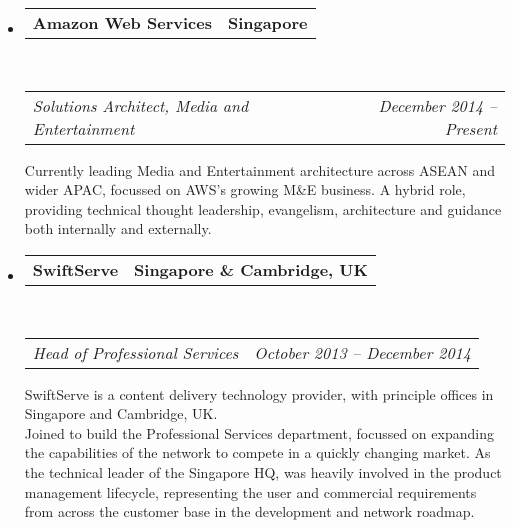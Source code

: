 \documentclass[10pt,a4paper]{article}
\makeatletter
\newcommand{\headerrow}[2]
{\begin{tabular*}{\linewidth}{l@{\extracolsep{\fill}}r}
    #1 &
    #2 \\
\end{tabular*}}
\makeatother
\begin{document}
\begin{itemize}
    \parskip=0.1em

    \item
        \headerrow
            {\textbf{Amazon Web Services}}
            {\textbf{Singapore}}
        \\
        \headerrow
            {\emph{Solutions Architect, Media and Entertainment}}
            {\emph{December 2014 -- Present}}
            
            Currently leading Media and Entertainment architecture across ASEAN and wider APAC, focussed on AWS's growing M\&E business. A hybrid role, providing technical thought leadership, evangelism, architecture and guidance both internally and externally.  
            


    \item
        \headerrow
            {\textbf{SwiftServe}}
            {\textbf{Singapore \& Cambridge, UK}}
        \\
        \headerrow
            {\emph{Head of Professional Services}}
            {\emph{October 2013 -- December 2014}}
    
            SwiftServe is a content delivery technology provider, with principle offices in Singapore and Cambridge, UK.
            \\
            Joined to build the Professional Services department, focussed on expanding the capabilities of the network to compete in a quickly changing market. As the technical leader of the Singapore HQ, was heavily involved in the product management lifecycle, representing the user and commercial requirements from across the customer base in the development and network roadmap.
            

\end{itemize}
\end{document}
